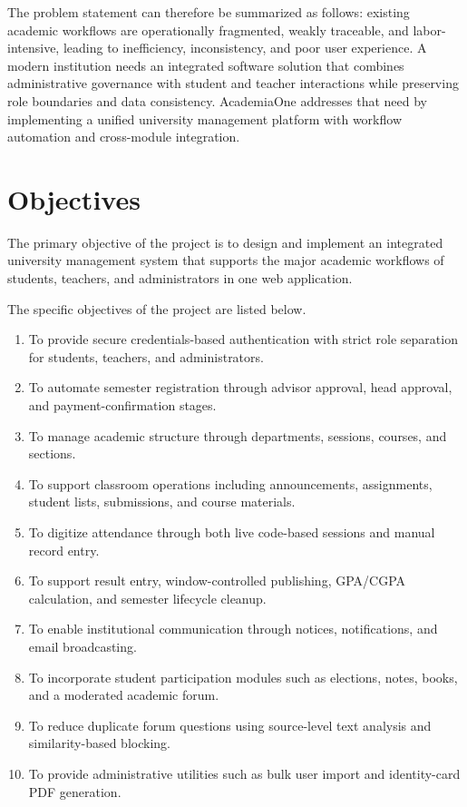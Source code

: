 \documentclass[12pt,a4paper]{report}
\newcommand{\systemName}{AcademiaOne}
\begin{document}
The problem statement can therefore be summarized as follows: existing academic workflows are operationally fragmented, weakly traceable, and labor-intensive, leading to inefficiency, inconsistency, and poor user experience. A modern institution needs an integrated software solution that combines administrative governance with student and teacher interactions while preserving role boundaries and data consistency. \systemName{} addresses that need by implementing a unified university management platform with workflow automation and cross-module integration.

\section{Objectives}
The primary objective of the project is to design and implement an integrated university management system that supports the major academic workflows of students, teachers, and administrators in one web application.

The specific objectives of the project are listed below.
\begin{enumerate}
  \item To provide secure credentials-based authentication with strict role separation for students, teachers, and administrators.
  \item To automate semester registration through advisor approval, head approval, and payment-confirmation stages.
  \item To manage academic structure through departments, sessions, courses, and sections.
  \item To support classroom operations including announcements, assignments, student lists, submissions, and course materials.
  \item To digitize attendance through both live code-based sessions and manual record entry.
  \item To support result entry, window-controlled publishing, GPA/CGPA calculation, and semester lifecycle cleanup.
  \item To enable institutional communication through notices, notifications, and email broadcasting.
  \item To incorporate student participation modules such as elections, notes, books, and a moderated academic forum.
  \item To reduce duplicate forum questions using source-level text analysis and similarity-based blocking.
  \item To provide administrative utilities such as bulk user import and identity-card PDF generation.
\end{enumerate}
\end{document}
